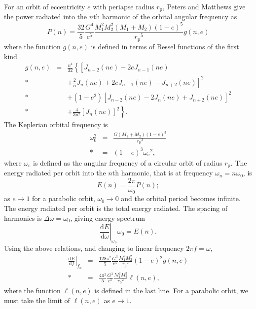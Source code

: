 \documentclass[aps,prd,reprint,showpacs,groupedaddress]{revtex4-1}
\newcommand{\sub}[1]{\ensuremath{_\text{#1}}}
\newcommand{\dd}{\ensuremath{\mathrm{d}}}
\newcommand{\diff}[2]{\ensuremath{\frac{\dd {#1}}{\dd {#2}}}}
\begin{document}
For an orbit of eccentricity $e$ with periapse radius $r\sub{p}$, Peters and Matthews\cite{Peters1963} give the power radiated into the $n$th harmonic of the orbital angular frequency as
\begin{equation}
P(n) = \frac{32}{5}\frac{G^4}{c^5}\frac{M_1^2M_2^2(M_1 + M_2)(1-e)^5}{r\sub{p}^5}g(n,e)
\label{eq:PM_P}
\end{equation}
where the function $g(n,e)$ is defined in terms of Bessel functions of the first kind
\begin{eqnarray}
g(n,e) & = & \frac{n^4}{32}\left\{\left[J_{n-2}(ne) - 2eJ_{n-1}(ne) \phantom{\frac{2}{n}J_n(ne)} \right. \right. \nonumber \\*
 & & \left. + \frac{2}{n}J_n(ne) + 2eJ_{n+1}(ne) - J_{n+2}(ne)\right]^2 \nonumber \\*
 & & + \left(1 - e^2\right)\left[J_{n-2}(ne) - 2J_n(ne) + J_{n+2}(ne)\right]^2 \nonumber \\*
 & & \left. + \frac{4}{3n^2}\left[J_n(ne)\right]^2\right\}.
\end{eqnarray}
The Keplerian orbital frequency is
\begin{eqnarray}
\omega_0^2 & = & \frac{G(M_1 + M_2)(1-e)^3}{r\sub{p}^3}\\*
 & = & (1-e)^3\omega\sub{c}^2,
\label{eq:Kepler_freq}
\end{eqnarray}
where $\omega\sub{c}$ is defined as the angular frequency of a circular orbit of radius $r\sub{p}$. The energy radiated per orbit into the $n$th harmonic, that is at frequency $\omega_n = n\omega_0$, is
\begin{equation}
E(n) = \frac{2\pi}{\omega_0}P(n);
\label{eq:E(n)}
\end{equation}
as $e \rightarrow 1$ for a parabolic orbit, $\omega_0 \rightarrow 0$ and the orbital period becomes infinite. The energy radiated per orbit is the total energy radiated. The spacing of harmonics is $\Delta\omega = \omega_0$, giving energy spectrum
\begin{equation}
\left.\diff{E}{\omega}\right|_{\omega_n}\omega_0 = E(n).
\end{equation}
Using the above relations, and changing to linear frequency $2\pi f = \omega$,
\begin{eqnarray}
\left.\diff{E}{f}\right|_{f_n} & = & \frac{128\pi^2}{5}\frac{G^3}{c^5}\frac{M_1^2M_2^2}{r\sub{p}^2}(1-e)^2g(n,e) \\*
 & = & \frac{4\pi^2}{5}\frac{G^3}{c^5}\frac{M_1^2M_2^2}{r\sub{p}^2}\ell(n,e),
\label{eq:PM_spectrum}
\end{eqnarray}
where the function $\ell(n,e)$ is defined in the last line. For a parabolic orbit, we must take the limit of $\ell(n,e)$ as $e \rightarrow 1$.
\end{document}
